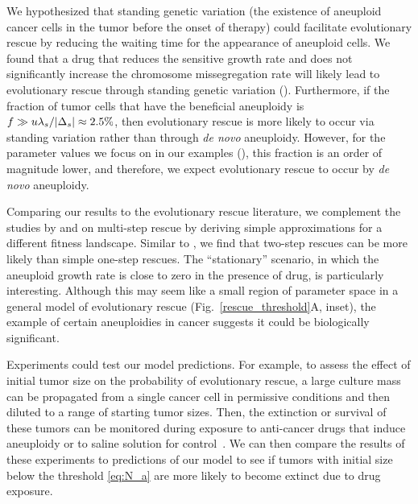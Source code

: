\documentclass[12pt]{extarticle}
\begin{document}
We hypothesized that standing genetic variation (the existence of aneuploid cancer cells in the tumor before the onset of therapy) could facilitate evolutionary rescue by reducing the waiting time for the appearance of aneuploid cells. We found that a drug that reduces the sensitive growth rate and does not significantly increase the chromosome missegregation rate will likely lead to evolutionary rescue through standing genetic variation ().
Furthermore, if the fraction of tumor cells that have the beneficial aneuploidy is $f \gg u \lambda_s / \abs{\Delta_s} \approx2.5\%$, then evolutionary rescue is more likely to occur via standing variation rather than through \textit{de novo} aneuploidy. 
However, for the parameter values we focus on in our examples (), this fraction is an order of magnitude lower, and therefore, we expect evolutionary rescue to occur by \textit{de novo} aneuploidy.

Comparing our results to the evolutionary rescue literature, we complement the studies by \citet{iwasa2003evolutionary} and \citet{osmond_genetic_2020} on multi-step rescue by deriving simple approximations for a different fitness landscape. 
Similar to \citet{osmond_genetic_2020}, we find that two-step rescues can be more likely than simple one-step rescues. 
The ``stationary'' scenario, in which the aneuploid growth rate is close to zero in the presence of drug, is particularly interesting.
Although this may seem like a small region of parameter space in a general model of evolutionary rescue (Fig.~\ref{rescue_threshold}A, inset), the example of certain aneuploidies in cancer suggests it could be biologically significant.

Experiments could test our model predictions. For example, to assess the effect of initial tumor size on the probability of evolutionary rescue, a large culture mass can be propagated from a single cancer cell in permissive conditions and then diluted to a range of starting tumor sizes. Then, the extinction or survival of these tumors can be monitored during exposure to anti-cancer drugs that induce aneuploidy or to saline solution for control~\citep{ippolito2021gene}. 
We can then compare the results of these experiments to predictions of our model to see if tumors with initial size below the threshold \cref{eq:N_a} are more likely to become extinct due to drug exposure.
\end{document}
